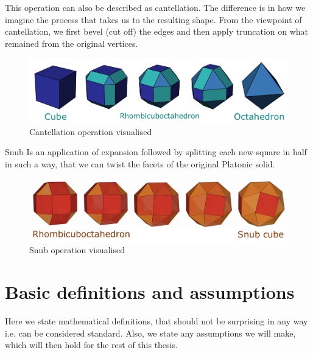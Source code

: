 \begin{description}
    This operation can also be described as cantellation. The difference is in how we imagine the process that takes us to the resulting shape. From the viewpoint of cantellation, we first bevel (cut off) the edges and then apply truncation on what remained from the original vertices.
    \begin{figure}[H]
        \centering
        \includegraphics[width=1\textwidth]{../Resources/Figs/op_cantellation.pdf}
        \caption{Cantellation operation visualised \cite{wikimedia-cube-cantellation}}
        \label{fig:op_cantellation}
    \end{figure}
    \begin{highlight}
    \item[Snub] Is an application of expansion followed by splitting each new square in half in such a way, that we can twist the facets of the original Platonic solid.
    \end{highlight}
    \begin{figure}[H]
        \centering
        \includegraphics[width=1\textwidth]{../Resources/Figs/op_snub.pdf}
        \caption{Snub operation visualised \cite{natal-polyhed-viewer}}
        \label{fig:op_snub}
    \end{figure}
    
\end{description}

\section{Basic definitions and assumptions}

Here we state mathematical definitions, that should not be surprising in any way i.e. can be considered standard. Also, we state any assumptions we will make, which will then hold for the rest of this thesis.

